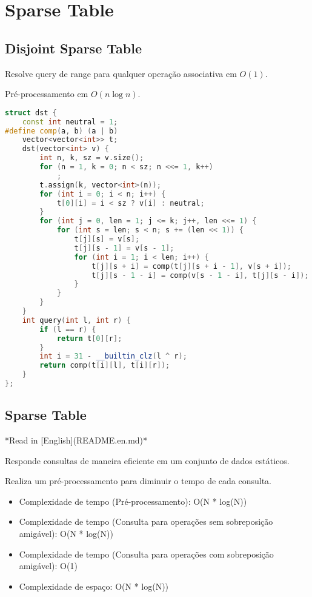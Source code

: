 \documentclass[11pt, a4paper, oneside]{book}
\begin{document}
\section{Sparse Table}
\subsection{Disjoint Sparse Table}


Resolve query de range para qualquer operação associativa em $O(1)$.



Pré-processamento em $O(n \log n)$.
\hfill

\begin{multicols}{2}
\begin{lstlisting}[language=C++]
struct dst {
    const int neutral = 1;
#define comp(a, b) (a | b)
    vector<vector<int>> t;
    dst(vector<int> v) {
        int n, k, sz = v.size();
        for (n = 1, k = 0; n < sz; n <<= 1, k++)
            ;
        t.assign(k, vector<int>(n));
        for (int i = 0; i < n; i++) {
            t[0][i] = i < sz ? v[i] : neutral;
        }
        for (int j = 0, len = 1; j <= k; j++, len <<= 1) {
            for (int s = len; s < n; s += (len << 1)) {
                t[j][s] = v[s];
                t[j][s - 1] = v[s - 1];
                for (int i = 1; i < len; i++) {
                    t[j][s + i] = comp(t[j][s + i - 1], v[s + i]);
                    t[j][s - 1 - i] = comp(v[s - 1 - i], t[j][s - i]);
                }
            }
        }
    }
    int query(int l, int r) {
        if (l == r) {
            return t[0][r];
        }
        int i = 31 - __builtin_clz(l ^ r);
        return comp(t[i][l], t[i][r]);
    }
};
\end{lstlisting}
\end{multicols}

\hfill

\subsection{Sparse Table}


*Read in [English](README.en.md)*



Responde consultas de maneira eficiente em um conjunto de dados estáticos.\

Realiza um pré-processamento para diminuir o tempo de cada consulta.



\begin{itemize}
\item Complexidade de tempo (Pré-processamento): O(N * log(N))
\item Complexidade de tempo (Consulta para operações sem sobreposição amigável): O(N * log(N))
\item Complexidade de tempo (Consulta para operações com sobreposição amigável): O(1)
\item Complexidade de espaço: O(N * log(N))
\end{itemize}
\end{document}
